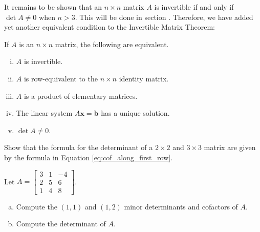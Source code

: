 \documentclass[12pt,letterpaper,reqno]{article}
\numberwithin{equation}{section}
\newcommand{\fixme}[1]{{\color{orange}{[#1]}}}
\begin{document}
It remains to be shown that an $n \times n$ matrix $A$ is invertible if and only if $\det A \neq 0$ when $n>3$. This will be done in section \fixme{Add section.}. Therefore, we have added yet another equivalent condition to the Invertible Matrix Theorem:

\begin{thm}\label{thm:invertible_matrix_theorem_part_3}
	If $A$ is an $n \times n$ matrix, the following are equivalent.
	\begin{enumerate}[(i)]
		\item $A$ is invertible.
		\item $A$ is row-equivalent to the $n \times n$ identity matrix.
		\item $A$ is a product of elementary matrices.
		\item The linear system $A\mathbf{x}=\mathbf{b}$ has a unique solution.
		\item $\det A \neq 0$.
	\end{enumerate} 	
\end{thm}


\begin{exercise}
Show that the formula for the determinant of a $2 \times 2$ and $3 \times 3$ matrix are given by the formula in Equation \eqref{eq:cof_along_first_row}.
\end{exercise}

\begin{exercise}
Let $A=\begin{bmatrix}
	3 & 1 & -4 \\ 2 & 5 & 6 \\ 1 & 4 & 8
\end{bmatrix}$. 
\begin{enumerate}[(a)]
	\item Compute the $(1,1)$ and $(1,2)$ minor determinants and cofactors of $A$.
	\item Compute the determinant of $A$.
\end{enumerate}	
\end{exercise}
\end{document}
